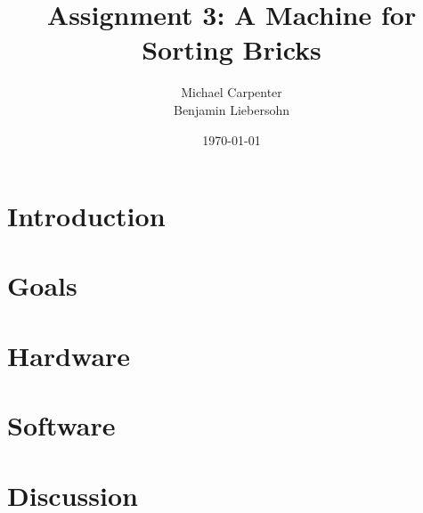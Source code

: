 \documentclass{article}
\title{Assignment 3: A Machine for Sorting Bricks}
\author{Michael Carpenter \\ Benjamin Liebersohn}
\date{\today}
\begin{document}
\maketitle

\section{Introduction}

\section{Goals}

\section{Hardware}

\section{Software}

\section{Discussion}
\end{document}
